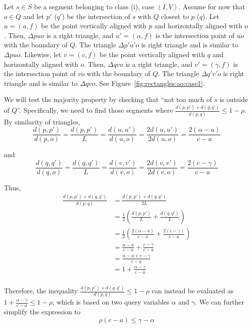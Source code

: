 Let $s \in S$ be a segment belonging to class (i), case $(I, V)$.
Assume for now that $o \in Q$ and let $p'$ ($q'$) be the intersection of $s$ with $Q$ closest to $p$ ($q$).  
Let $u = (a, f)$ be the point vertically aligned with $p$ and horizontally aligned with $o$. Then, $\Delta p u o$ is a right triangle, and $u' = (\alpha, f)$ is the intersection point of $\overline{u o}$ with the boundary of $Q$.  
The triangle $\Delta p' u' o$ is right triangle and is similar to $\Delta p u o$. 
Likewise, let $v = (c, f)$ be the point vertically aligned with $q$ and horizontally aligned with $o$. Then, $\Delta q v o$ is a right triangle, and $v' = (\gamma, f)$ is the intersection point of $\overline{v o}$ with the boundary of $Q$. The triangle $\Delta q' v' o$ is right triangle and is similar to $\Delta q v o$. See Figure~\ref{fig:rectangles:ao:case1}.

We will test the majority property by checking that ``not too much of $s$ is outside of $Q$''. Specifically, we need to find those segments where $\frac{d(p, p') + d(q, q')}{d(p, q)} \leq 1 - \rho$. By similarity of triangles, 
\[ 
\frac{d(p, p')}{d(p, o)} = \frac{d(p, p')}{L} = \frac{d(u, u')}{d(u, o)} = \frac{2 d(u, u')}{2 d(u, o)} = \frac{2(\alpha - a)}{c - a}
\]

\noindent and 
\[ 
\frac{d(q, q')}{d(q, o)} = \frac{d(q, q')}{L} = \frac{d(v, v')}{d(v, o)} = \frac{2 d(v, v')}{2 d(v, o)} = \frac{2(c - \gamma)}{c - a}
\]

\noindent Thus,
\[
\begin{split} 
\frac{d(p, p') + d(q, q')}{d(p, q)}
%
&= \frac{d(p, p') + d(q, q')}{2L} \\
%
&= \frac{1}{2} \left ( \frac{d(p, p')}{L} + \frac{d(q, q')}{L} \right ) \\
%
&= \frac{1}{2} \left ( \frac{2(\alpha - a)}{c - a} + \frac{2(c - \gamma)}{c - a} \right ) \\
%
&= \frac{\alpha - a}{c - a} + \frac{c - \gamma}{c - a} \\
%
&= \frac{\alpha - a + c - \gamma}{c - a} \\
%
&= 1 + \frac{\alpha - \gamma}{c - a} \\
%
\end{split}
\]

Therefore, the inequality $\frac{d(p, p') + d(q, q')}{d(p, q)} \leq 1 - \rho$ can instead be evaluated as $1 + \frac{\alpha - \gamma}{c - a} \leq 1 - \rho$, which is based on two query variables $\alpha$ and $\gamma$.  We can further simplify the expression to
\[ 
\rho(c - a) \leq \gamma - \alpha
\]

